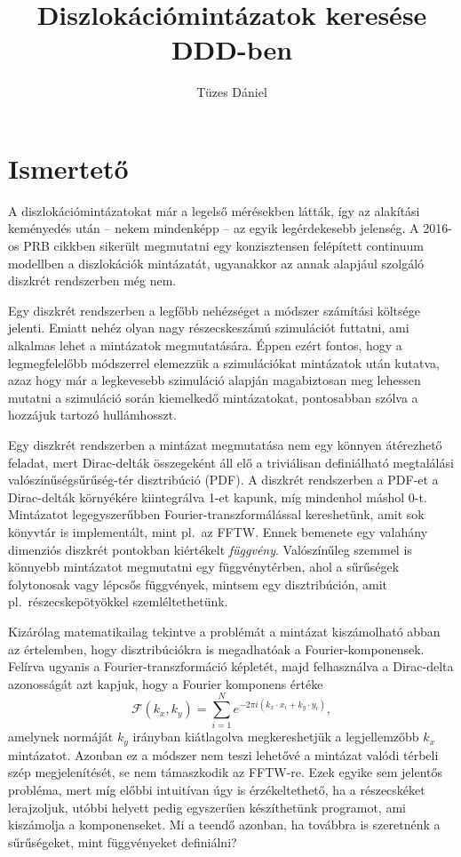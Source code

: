 \documentclass[10pt,a4paper]{scrartcl}
\title{Diszlokációmintázatok keresése DDD-ben}
\author{Tüzes Dániel}
\begin{document}
\maketitle
\tableofcontents

\section{Ismertető}
A diszlokációmintázatokat már a legelső mérésekben látták, így az alakítási keményedés után -- nekem mindenképp -- az egyik legérdekesebb jelenség. A 2016-os PRB cikkben sikerült megmutatni egy konzisztensen felépített continuum modellben a diszlokációk mintázatát, ugyanakkor az annak alapjául szolgáló diszkrét rendszerben még nem.

Egy diszkrét rendszerben a legfőbb nehézséget a módszer számítási költsége jelenti. Emiatt nehéz olyan nagy részecskeszámú szimulációt futtatni, ami alkalmas lehet a mintázatok megmutatására. Éppen ezért fontos, hogy a legmegfelelőbb módszerrel elemezzük a szimulációkat mintázatok után kutatva, azaz hogy már a legkevesebb szimuláció alapján magabiztosan meg lehessen mutatni a szimuláció során kiemelkedő mintázatokat, pontosabban szólva a hozzájuk tartozó hullámhosszt.

Egy diszkrét rendszerben a mintázat megmutatása nem egy könnyen átérezhető feladat, mert Dirac-delták összegeként áll elő a triviálisan definiálható megtalálási valószínűségsűrűség-tér disztribúció (PDF). A diszkrét rendszerben a PDF-et a Dirac-delták környékére kiintegrálva 1-et kapunk, míg mindenhol máshol 0-t. Mintázatot legegyszerűbben Fourier-transzformálással kereshetünk, amit sok könyvtár is implementált, mint pl.\ az FFTW. Ennek bemenete egy valahány dimenziós diszkrét pontokban kiértékelt \textit{függvény}. Valószínűleg szemmel is könnyebb mintázatot megmutatni egy függvénytérben, ahol a sűrűségek folytonosak vagy lépcsős függvények, mintsem egy disztribúción, amit pl.\ részecskepötyökkel szemléltethetünk.

Kizárólag matematikailag tekintve a problémát a mintázat kiszámolható abban az értelemben, hogy disztribúciókra is megadhatóak a Fourier-komponensek. Felírva ugyanis a Fourier-transzformáció képletét, majd felhasználva a Dirac-delta azonosságát azt kapjuk, hogy a Fourier komponens értéke
\[\mathcal{F}\left( {{k_x},{k_y}} \right) = \sum\limits_{i = 1}^N {{e^{ - 2\pi i\left( {{k_x} \cdot {x_i} + {k_y} \cdot {y_i}} \right)}}},\]
amelynek normáját ${{k_y}}$ irányban kiátlagolva megkereshetjük a legjellemzőbb ${{k_x}}$ mintázatot. Azonban ez a módszer nem teszi lehetővé a mintázat valódi térbeli szép megjelenítését, se nem támaszkodik az FFTW-re. Ezek egyike sem jelentős probléma, mert míg előbbi intuitívan úgy is érzékeltethető, ha a részecskéket lerajzoljuk, utóbbi helyett pedig egyszerűen készíthetünk programot, ami kiszámolja a komponenseket. Mi a teendő azonban, ha továbbra is szeretnénk a sűrűségeket, mint függvényeket definiálni?
\end{document}
